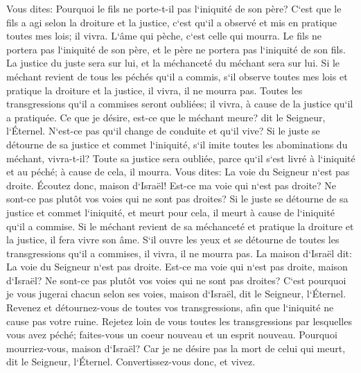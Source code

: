 \verse Vous dites: Pourquoi le fils ne porte-t-il pas l`iniquité de son père? C`est que le fils a agi selon la droiture et la justice, c`est qu`il a observé et mis en pratique toutes mes lois; il vivra. 
\verse L`âme qui pèche, c`est celle qui mourra. Le fils ne portera pas l`iniquité de son père, et le père ne portera pas l`iniquité de son fils. La justice du juste sera sur lui, et la méchanceté du méchant sera sur lui. 
\verse Si le méchant revient de tous les péchés qu`il a commis, s`il observe toutes mes lois et pratique la droiture et la justice, il vivra, il ne mourra pas. 
\verse Toutes les transgressions qu`il a commises seront oubliées; il vivra, à cause de la justice qu`il a pratiquée. 
\verse Ce que je désire, est-ce que le méchant meure? dit le Seigneur, l`Éternel. N`est-ce pas qu`il change de conduite et qu`il vive? 
\verse Si le juste se détourne de sa justice et commet l`iniquité, s`il imite toutes les abominations du méchant, vivra-t-il? Toute sa justice sera oubliée, parce qu`il s`est livré à l`iniquité et au péché; à cause de cela, il mourra. 
\verse Vous dites: La voie du Seigneur n`est pas droite. Écoutez donc, maison d`Israël! Est-ce ma voie qui n`est pas droite? Ne sont-ce pas plutôt vos voies qui ne sont pas droites? 
\verse Si le juste se détourne de sa justice et commet l`iniquité, et meurt pour cela, il meurt à cause de l`iniquité qu`il a commise. 
\verse Si le méchant revient de sa méchanceté et pratique la droiture et la justice, il fera vivre son âme. 
\verse S`il ouvre les yeux et se détourne de toutes les transgressions qu`il a commises, il vivra, il ne mourra pas. 
\verse La maison d`Israël dit: La voie du Seigneur n`est pas droite. Est-ce ma voie qui n`est pas droite, maison d`Israël? Ne sont-ce pas plutôt vos voies qui ne sont pas droites? 
\verse C`est pourquoi je vous jugerai chacun selon ses voies, maison d`Israël, dit le Seigneur, l`Éternel. Revenez et détournez-vous de toutes vos transgressions, afin que l`iniquité ne cause pas votre ruine. 
\verse Rejetez loin de vous toutes les transgressions par lesquelles vous avez péché; faites-vous un coeur nouveau et un esprit nouveau. Pourquoi mourriez-vous, maison d`Israël? 
\verse Car je ne désire pas la mort de celui qui meurt, dit le Seigneur, l`Éternel. Convertissez-vous donc, et vivez. 

